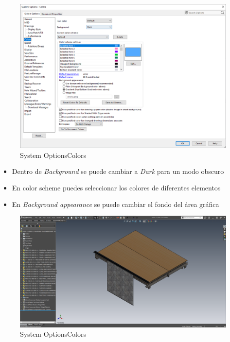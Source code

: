 \documentclass[12pt,letterpaper,final]{report}
\begin{document}
\begin{figure}[H]
	\centering
	\includegraphics[width=0.95\linewidth, height=0.65\textheight,keepaspectratio]{Imagenes/solidworks_dark_mode01}
	\caption{System Options\textrightarrow Colors}
	\label{fig:solidworksdarkmode01}
\end{figure}

\begin{itemize}
	\item Dentro de \emph{Background} se puede cambiar a \emph{Dark} para un modo obscuro
	\item En color scheme puedes seleccionar los colores de diferentes elementos
	\item En \emph{Background appearance} se puede cambiar el fondo del área gráfica
\end{itemize}

\begin{figure}[H]
	\centering
	\includegraphics[width=0.95\linewidth, height=0.75\textheight,keepaspectratio]{Imagenes/solidworks_dark_mode02}
	\caption{System Options\textrightarrow Colors}
	\label{fig:solidworksdarkmode02}
\end{figure}
\end{document}

